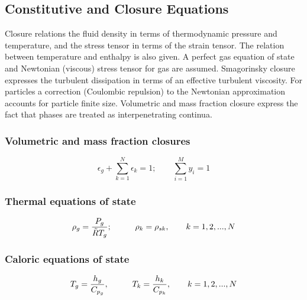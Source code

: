 \subsection{Constitutive and Closure Equations}
Closure relations the fluid density in terms of thermodynamic pressure 
and temperature, and the stress tensor in terms of the strain tensor.
The relation between temperature and enthalpy is also given.
A perfect gas equation of state and Newtonian (viscous) stress tensor
for gas are assumed. Smagorinsky closure expresses the turbulent 
dissipation in terms of an effective turbulent viscosity.
For particles a correction (Coulombic repulsion) to the Newtonian 
approximation accounts for particle finite size. Volumetric and mass
fraction closure express the fact that phases are treated as 
interpenetrating continua.

\subsubsection{\hspace{1cm} Volumetric and mass fraction closures}

\begin{equation}
\epsilon_{g} + \sum_{k=1}^{N}\epsilon_{k} = 1; 
\qquad \sum_{i=1}^{M}y _{i} = 1
\label{eq:closeps}
\end{equation}

\subsubsection{\hspace{1cm}Thermal equations of state}

\begin{equation}
\rho_{g}=\frac{P_{g}}{\tilde{R} T_g}; 
\hspace{10mm}\rho_{k}=\rho_{sk},\qquad k=1,2,...,N
\label{eq:th_eosg}
\end{equation}


\subsubsection{\hspace{1cm}Caloric equations of state}

\begin{equation}
T_{g}=\frac{h_{g}}{C_{p_{g}}}, 
\hspace{10mm} T_{k}=\frac{h_{k}}{C_{p_{k}}}, \qquad k=1,2,...,N
\label{eq:caloric_eos}
\end{equation}


